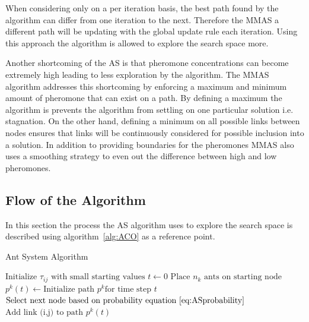 When considering only on a per iteration basis, the best path found by the algorithm can differ from one iteration to the next\cite{FundamentalSwarm}. Therefore the \gls{MMAS} a different path will be updating with the global update rule each iteration\cite{FundamentalSwarm}. Using this approach the algorithm is allowed to explore the search space more\cite{FundamentalSwarm}.

Another shortcoming of the \gls{AS} is that pheromone concentrations can become extremely high leading to less exploration by the algorithm\cite{FundamentalSwarm}. The \gls{MMAS} algorithm addresses this shortcoming by enforcing a maximum and minimum amount of pheromone that can exist on a path\cite{FundamentalSwarm}. By defining a maximum the algorithm is prevents the algorithm from settling on one particular solution i.e. stagnation\cite{FundamentalSwarm}. On the other hand, defining a minimum on all possible links between nodes ensures that links will be continuously considered for possible inclusion into a solution\cite{FundamentalSwarm}. In addition to providing boundaries for the pheromones \gls{MMAS} also uses a smoothing strategy to even out the difference between high and low pheromones\cite{FundamentalSwarm}.

\subsection{Flow of the Algorithm}
In this section the process the \gls{AS} algorithm uses to explore the search space is described using algorithm~\ref{alg:ACO} as a reference point.
\begin{algorithm}[H]
\caption{Ant System Algorithm~\cite{CompuIntelligenceIntro}}
\label{alg:ACO}
	\begin{algorithmic}[1]
	\State$\text{Initialize $\tau_{ij}$ with small starting values}$
	\State$t \leftarrow 0$
	\State$\text{Place $n_k$ ants on starting node}$
			\State$p^k(t) \leftarrow \text{Initialize path } p^k \text{for time step } t$
			\Repeat
				\State$\text{Select next node based on probability equation~\ref{eq:ASprobability}}$
				\State$\text{Add link (i,j) to path } p^k(t)$
	\end{algorithmic}
\addtocounter{algorithm}{-1}
\end{algorithm}

